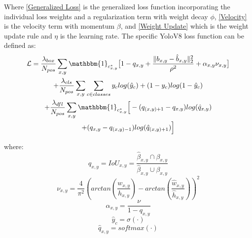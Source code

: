 \documentclass[10pt,twocolumn,letterpaper]{article}
\begin{document}
Where \ref{Generalized Loss} is the generalized loss function incorporating the individual loss weights and a regularization term with weight decay $\phi$, \ref{Velocity} is the velocity term with momentum $\beta$, and \ref{Weight Update} which is the weight update rule and $\eta$ is the learning rate. The specific YoloV8 loss function can be defined as:
\begin{multline}
\mathcal{L} = \dfrac{\lambda_{box}}{N_{pos}}\sum_{x,y}\mathbbm{1}_{c^*_{x,y}}\big[1 - q_{x,y} + \dfrac{\Vert b_{x,y} - \hat{b}_{x,y} \Vert_2^2}{\rho^2} + \alpha_{x,y}\nu_{x,y}\big] \\  + \dfrac{\lambda_{cls}}{N_{pos}}\sum_{x,y}\sum_{c\in classes}y_clog(\hat{y}_c) + (1 - y_c)log(1 - \hat{y}_c) \\
+ \dfrac{\lambda_{dfl}}{N_{pos}}\sum_{x,y}\mathbbm{1}_{c^*_{x,y}}\Big[-(q_{(x,y)+1} - q_{x,y})log(\hat{q}_{x,y}) \\
+ (q_{x,y} - q_{(x,y)-1})log(\hat{q}_{(x,y)+1})\Big]
\end{multline}

where:
\begin{equation*}\label{IoU}
q_{x,y} = IoU_{x,y} = \dfrac{\hat{\beta}_{x,y}\displaystyle \cap\beta_{x,y}}{\hat{\beta}_{x,y}\displaystyle \cup\beta_{x,y}}
\end{equation*}
\begin{equation*}\label{v}
\nu_{x,y} = \dfrac{4}{\pi^2}(arctan(\dfrac{w_{x,y}}{h_{x,y}}) - arctan(\dfrac{\hat{w}_{x,y}}{\hat{h}_{x,y}}))^2
\end{equation*}
\begin{equation*}\label{a}
\alpha_{x,y} = \dfrac{\nu}{1 - q_{x,y}}
\end{equation*}
\begin{equation*}\label{y_hat}
\hat{y}_c = \sigma({\cdot})
\end{equation*}
\begin{equation*}\label{q_hat}
\hat{q}_{x,y} = softmax({\cdot})
\end{equation*}
    
\end{document}
